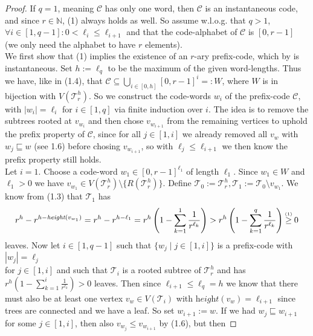 \documentclass[12pt]{article}
\newcommand{\up}[2]{\mathrel{\overset{\makebox[0pt]{\mbox{\normalfont\tiny #2}}}{#1}}}
\newcommand{\T}[0]{{\mathcal{T}_r^h}}
\newcommand{\he}[0]{\textit{height}}
\newenvironment{statement3}[3]{\begin{trivlist}
\item[\hskip \labelsep {\bfseries #1}\hskip \labelsep {\bfseries #2} {#3}\textbf{.}]}{\end{trivlist}}
\begin{document}
\begin{statement3}{(1.7)}{Theorem}{(Kraft's Inequality)}
    \begin{proof}
        If $q = 1$, meaning $\mathcal{C}$ has only one word, then $\mathcal{C}$ is an instantaneous code, and since $r \in \mathbb{N}$, (1) always holds
        as well.
        So assume w.l.o.g. that $q > 1$, $\forall i \in [1,q-1]: 0 < \ell_i \leq \ell_{i+1}$
        and that the code-alphabet of $\mathcal{C}$ is $[0,r-1]$ (we only need the alphabet to have $r$ elements).
        \\[10pt]
        We first show that (1) implies the existence of an $r$-ary prefix-code, which by
        \cite{ICT} is instantaneous.
        Set $h := \ell_q$ to be the maximum of the given word-lengths.
        Thus we have, like in (1.4), that $\mathcal{C} \subseteq \bigcup_{i \in [0,h]} [0,r-1]^i =: W$, where
        $W$ is in bijection with $V(\T)$.
        So we construct the code-words $w_i$ of the prefix-code $\mathcal{C}$, with $|w_i| = \ell_i$ for $i \in [1,q]$
        via finite induction over $i$. The idea is to remove the subtrees rooted at $v_{w_i}$ and then
        chose $v_{w_{i+1}}$ from the remaining vertices to uphold the prefix property of $\mathcal{C}$,
        since for all $j \in [1,i]$ we already removed all $v_{w}$ with $w_j \sqsubseteq w$ (see 1.6)
        before chosing $v_{w_{i+1}}$, so with $\ell_j \leq \ell_{i+1}$ we then know the prefix property still holds.\\[10pt]
        Let $i = 1$. Choose a code-word $w_1 \in [0,r-1]^{\ell_1}$ of length $\ell_1$. Since $w_1 \in W$ and $\ell_1 > 0$ we have
        $v_{w_1} \in V(\T) \setminus \{R(\T)\}$. Define $\mathcal{T}_0 := \T, \mathcal{T}_1 := \mathcal{T}_0 \setminus v_{w_1}$. We know
        from (1.3) that $\mathcal{T}_1$ has
        $$
            r^h - r^{h - \he(v_{w_1})} = r^h - r^{h - \ell_1} = r^h\left(1 - \sum_{k=1}^{1} \frac{1}{r^{\ell_k}}\right)
            > r^h\left(1 - \sum_{k=1}^{q} \frac{1}{r^{\ell_k}}\right) \up{\geq}{(1)} 0
        $$
        leaves. Now let $i \in [1,q-1]$ such that $\{w_j \mid j \in [1,i]\}$ is a prefix-code
        with $|w_j| = \ell_j$\\[2pt]
        for $j \in [1,i]$ and such that $\mathcal{T}_i$ is a rooted subtree of $\T$ and has $r^h(1 - \sum_{k=1}^{i}\frac{1}{r^{\ell_k}}) > 0$ leaves.
        Then since $\ell_{i+1} \leq \ell_q = h$ we know that there must also be at least one vertex
        $v_w \in V(\mathcal{T}_i)$ with $\he(v_w) = \ell_{i+1}$ since trees are connected and we have a leaf.
        So set $w_{i+1} := w$. If we had $w_j \sqsubseteq w_{i+1}$ for
        some $j \in [1,i]$, then also $v_{w_j} \leq v_{w_{i+1}}$ by (1.6), but then

\end{proof}
\end{statement3}
\end{document}
